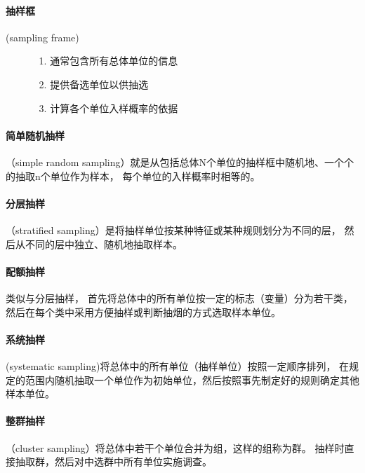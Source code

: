\documentclass[UTF8,10pt]{book}
\begin{document}
        \paragraph{抽样框}
            (sampling frame)
        
            \begin{itemize}
                \item [] {
                    \begin{enumerate}
                        \item [1.] 通常包含所有总体单位的信息
                        \item [2.] 提供备选单位以供抽选
                        \item [3.] 计算各个单位入样概率的依据
                                        
                    \end{enumerate}
                }
            \end{itemize}
        \paragraph{简单随机抽样}
            （simple random sampling）就是从包括总体N个单位的抽样框中随机地、一个个的抽取n个单位作为样本，
        每个单位的入样概率时相等的。
        \paragraph{分层抽样}
            （stratified sampling）是将抽样单位按某种特征或某种规则划分为不同的层，
        然后从不同的层中独立、随机地抽取样本。
        \paragraph{配额抽样}
            类似与分层抽样，
            首先将总体中的所有单位按一定的标志（变量）分为若干类，
            然后在每个类中采用方便抽样或判断抽烟的方式选取样本单位。
        \paragraph{系统抽样}
            (systematic sampling)将总体中的所有单位（抽样单位）按照一定顺序排列，
            在规定的范围内随机抽取一个单位作为初始单位，然后按照事先制定好的规则确定其他样本单位。
        \paragraph{整群抽样}
            （cluster sampling）将总体中若干个单位合并为组，这样的组称为群。
            抽样时直接抽取群，然后对中选群中所有单位实施调查。
\end{document}
